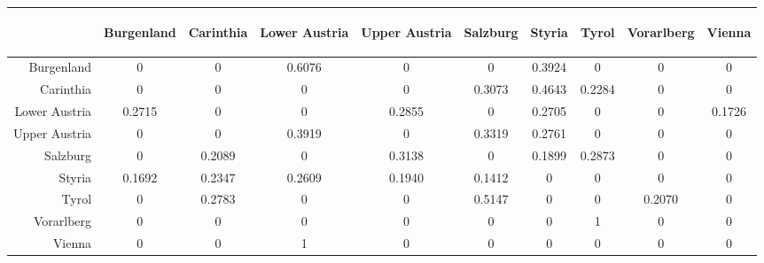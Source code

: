 \documentclass[a4paper,reqno,]{article}
\begin{document}
\begin{minipage}[h!]{0.98\textwidth}
\centering
{}
\label{tab:w_borderlen}
\vspace{1.7cm}
\begin{tabular}[h!]{r|ccccccccc}
&
\begin{rotate}{60} Burgenland \end{rotate} &
\begin{rotate}{60} Carinthia \end{rotate} &
\begin{rotate}{60} Lower Austria\end{rotate} &
\begin{rotate}{60} Upper Austria\end{rotate} &
\begin{rotate}{60} Salzburg\end{rotate} &
\begin{rotate}{60} Styria\end{rotate} &
\begin{rotate}{60} Tyrol\end{rotate}&
\begin{rotate}{60} Vorarlberg\end{rotate}&
\begin{rotate}{60} Vienna\end{rotate}\\ \hline 
Burgenland       & 0 & 0  &   0.6076     &   0 & 0 & 0.3924    & 0 & 0 & 0 \\
Carinthia        & 0 & 0  &   0  &   0 & 0.3073    & 0.4643    & 0.2284    & 0 & 0 \\
Lower Austria    & 0.2715 & 0  &   0  &   0.2855    & 0 & 0.2705    & 0 & 0 & 0.1726 \\
Upper Austria    & 0 & 0  &   0.3919     &   0 & 0.3319    & 0.2761    & 0 & 0 & 0 \\
Salzburg        &  0 & 0.2089     &   0  &   0.3138    & 0 & 0.1899    & 0.2873    & 0 & 0 \\
Styria        & 0.1692 & 0.2347     &   0.2609     &   0.1940    & 0.1412    & 0 & 0 & 0 & 0 \\
Tyrol        &0 & 0.2783  &   0  &   0 & 0.5147    & 0 & 0 & 0.2070 & 0 \\
Vorarlberg        & 0 & 0  &   0  &   0 & 0 & 0 & 1 & 0 & 0 \\
Vienna        & 0 & 0  &   1  &   0 & 0 & 0 & 0 & 0 & 0  \\\hline
\end{tabular}
\end{minipage}
\end{document}
